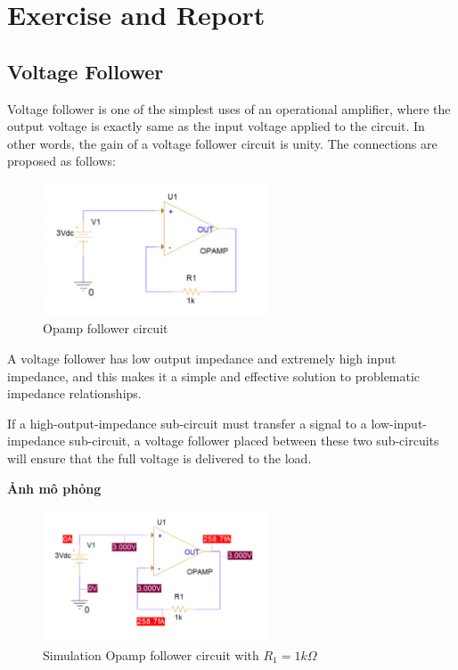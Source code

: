 \section{Exercise and Report}
\subsection{Voltage Follower}
Voltage follower is one of the simplest uses of an operational amplifier, where the output
voltage is exactly same as the input voltage applied to the circuit. In other words, the gain
of a voltage follower circuit is unity. The connections are proposed as follows:
\begin{figure}[h]
    \centering
    \includegraphics[width=0.6\textwidth]{graphics/ex1/f1.png}
    \caption{ Opamp follower circuit}
\end{figure}

A voltage follower has low output impedance and extremely high input impedance, and
this makes it a simple and effective solution to problematic impedance relationships.

If
a high-output-impedance sub-circuit must transfer a signal to a low-input-impedance
sub-circuit, a voltage follower placed between these two sub-circuits will ensure that the
full voltage is delivered to the load.

\textbf{Ảnh mô phỏng}

\begin{figure}[ht]
    \centering
    \includegraphics[width=0.6\textwidth]{graphics/ex1/f2.png}
    \caption{Simulation Opamp follower circuit with $R_1 = 1k \Omega$ }
\end{figure}

